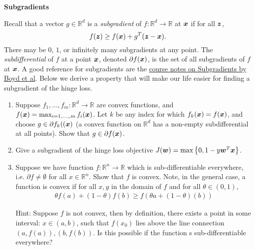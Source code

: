 \documentclass{article}
\newcommand{\nyuparagrah}[1]{\textcolor{nyupurple}{\large #1}}
\theoremstyle{plain}
\theoremstyle{definition}
\begin{document}
\nyuparagrah{\bf Subgradients} 

Recall that a vector $g\in\mathbb{R}^{d}$ is a \emph{subgradient} of
$f:\mathbb{R}^{d}\to\mathbb{R}$ at $\boldsymbol{x}$ if for all $\boldsymbol{z}$, 
\[
f(\boldsymbol{z})\ge f(\boldsymbol{x})+g^{T}(\boldsymbol{z}- \boldsymbol{x}).
\]
There may be $0$, $1$, or infinitely many
subgradients at any point. The \emph{subdifferential} of $f$ at
a point $\boldsymbol{x}$, denoted $\partial f(\boldsymbol{x})$, is the set of all subgradients
of $f$ at $\boldsymbol{x}$. 
  A good reference for subgradients are the \href{https://stanford.edu/class/ee364b/lectures/subgradients_notes.pdf}{course notes on Subgradients by Boyd et al}.
Below we derive a property
that will make our life easier for finding a subgradient of the hinge
loss.

\begin{enumerate}
  \setcounter{enumi}{\value{saveenum}}
\item Suppose $f_{1},\ldots,f_{m}:\mathbb{R}^{d}\to\mathbb{R}$
are convex functions, and 
$f(\boldsymbol{x})=\max_{i=1,\ldots,,m}f_{i}(\boldsymbol{x})$.
Let $k$ be any index for which $f_{k}(\boldsymbol{x})=f(\boldsymbol{x})$, and choose $g\in\partial f_{k}((\boldsymbol{x})$ (a convex function on $\mathbb{R}^{d}$ has
a non-empty subdifferential at all points). Show that $g\in\partial f(\boldsymbol{x})$.

\item Give a subgradient of the hinge loss objective
$J(\boldsymbol{w})=\max\left\{ 0,1-y \boldsymbol{w}^{T} \boldsymbol{x}\right\}$.
 
\item Suppose we have function $f:\mathbb{R}^n\rightarrow\mathbb{R}$ which is sub-differentiable everywhere, i.e. $\partial f\neq \emptyset$ for all $x\in\mathbb{R}^n$. Show that $f$ is convex. Note, in the general case, a function is convex if for all $x,y$ in the domain of $f$ and for all $\theta \in (0,1)$,
\begin{align*}
    \theta f(a)+(1-\theta)f(b) \geq f(\theta a+(1-\theta)(b))
\end{align*}

Hint: Suppose $f$ is not convex, then by definition, there exists a point in some interval: $x\in (a,b)$, such that $f(x_0)$ lies above the line connection $(a,f(a)), (b,f(b))$. Is this possible if the function s sub-differentiable everywhere? 

\setcounter{saveenum}{\value{enumi}}
\end{enumerate}
\end{document}
